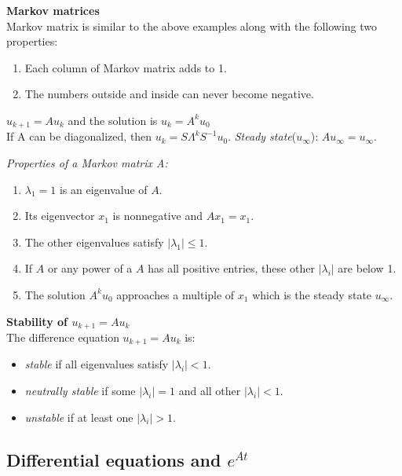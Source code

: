 \vspace{6pt}

\textbf{Markov matrices}\\
Markov matrix is similar to the above examples along with the following two properties:\\
\begin{enumerate}
\item Each column of Markov matrix adds to 1.
\item The numbers outside and inside can never become negative.
\end{enumerate}
$u_{k+1} = Au_k$  and the solution is $u_k = A^ku_0$\\
If A can be diagonalized, then $u_k = S\Lambda^kS^{-1}u_0$.
\textit{Steady state}($u_{\infty}$): $Au_{\infty} = u_{\infty}$.

\textit{Properties of a Markov matrix A:}\\
\begin{enumerate}
\item $\lambda_1= 1$ is an eigenvalue of $A$.
\item Its eigenvector $x_1$ is nonnegative and $Ax_1 = x_1$.
\item The other eigenvalues satisfy $|\lambda_1| \leq 1$.
\item If $A$ or any power of a $A$ has all positive entries, these other $|\lambda_i|$ are below 1. 
\item The solution $A^ku_0$ approaches a multiple of $x_1$ which is the steady state $u_{\infty}$.
\end{enumerate}




\textbf{Stability of $u_{k+1} = Au_k$}\\

The difference equation $u_{k+1} = Au_k$ is:\\
\begin{itemize}
\item \textit{stable} if all eigenvalues satisfy $|\lambda_i| < 1$.
\item \textit{neutrally stable} if some $|\lambda_i| = 1$ and all other $|\lambda_i| < 1$.
\item \textit{unstable} if at least one $|\lambda_i| > 1$.
\end{itemize}


\subsection{Differential equations and $e^{At}$}
